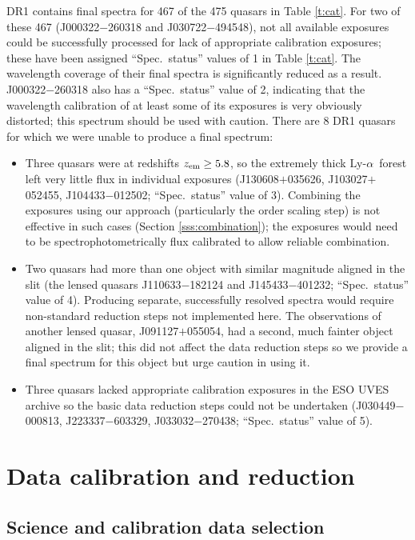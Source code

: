 \documentclass[fleqn,usenatbib,usedcolumn]{mnras}
\newcommand{\Sref}[1]{Section \ref{#1}}
\newcommand{\Tref}[1]{Table \ref{#1}}
\newcommand{\lya}{\ensuremath{\textrm{Ly-}\alpha}}
\newcommand{\zem}{\ensuremath{z_\textrm{\scriptsize em}}}
\begin{document}
DR1 contains final spectra for 467 of the 475 quasars in \Tref{t:cat}. For two of these 467 (J000322$-$260318 and J030722$-$494548), not all available exposures could be successfully processed for lack of appropriate calibration exposures; these have been assigned ``Spec.\ status'' values of 1 in \Tref{t:cat}. The wavelength coverage of their final spectra is significantly reduced as a result. J000322$-$260318 also has a ``Spec.\ status'' value of 2, indicating that the wavelength calibration of at least some of its exposures is very obviously distorted; this spectrum should be used with caution. There are 8 DR1 quasars for which we were unable to produce a final spectrum:
\begin{itemize}
\item Three quasars were at redshifts $\zem\ge5.8$, so the extremely thick \lya\ forest left very little flux in individual exposures (J130608$+$035626, J103027$+$052455, J104433$-$012502; ``Spec.\ status'' value of 3). Combining the exposures using our approach (particularly the order scaling step) is not effective in such cases (\Sref{sss:combination}); the exposures would need to be spectrophotometrically flux calibrated to allow reliable combination.
\item Two quasars had more than one object with similar magnitude aligned in the slit (the lensed quasars J110633$-$182124 and J145433$-$401232; ``Spec.\ status'' value of 4). Producing separate, successfully resolved spectra would require non-standard reduction steps not implemented here. The observations of another lensed quasar, J091127$+$055054, had a second, much fainter object aligned in the slit; this did not affect the data reduction steps so we provide a final spectrum for this object but urge caution in using it.
\item Three quasars lacked appropriate calibration exposures in the ESO UVES archive so the basic data reduction steps could not be undertaken (J030449$-$000813, J223337$-$603329, J033032$-$270438; ``Spec.\ status'' value of 5).
\end{itemize}


\section{Data calibration and reduction}\label{s:reduction}

\subsection{Science and calibration data selection}\label{ss:selection}
\end{document}
